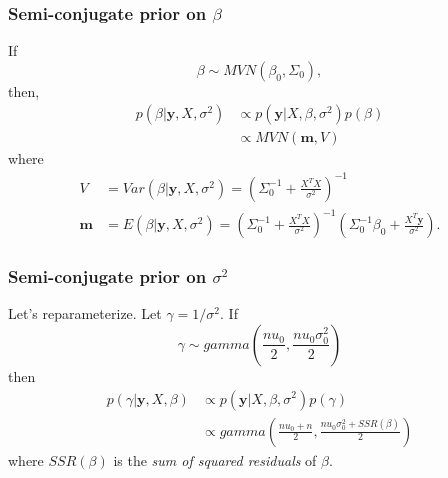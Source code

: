 \documentclass[titlepage, 12pt, leqno]{article}
\begin{document}
\subsubsection{Semi-conjugate prior on $\beta$}
If
\[
\beta \sim MVN(\beta_{0},\Sigma_{0}),
\]
then,
\begin{align*}
    p(\beta|\textbf{y},X,\sigma^{2}) &\propto p(\textbf{y}|X, \beta, \sigma^{2})
    p(\beta)\\
                                     &\propto MVN(\textbf{m},V)
\end{align*}
where
\begin{align*}
    V &= Var(\beta|\textbf{y},X,\sigma^{2}) = \left(\Sigma_{0}^{-1} +
        \frac{X^{T}X}{\sigma^{2}}\right)^{-1}\\
    \textbf{m} &= E(\beta|\textbf{y},X,\sigma^{2}) = \left(\Sigma_{0}^{-1} +
        \frac{X^{T}X}{\sigma^{2}}\right)^{-1}\left(\Sigma_{0}^{-1}\beta_{0}+
        \frac{X^{T}\textbf{y}}{\sigma^{2}}\right).
\end{align*}

\subsubsection{Semi-conjugate prior on $\sigma^{2}$}
Let's reparameterize. Let $\gamma = 1/\sigma^{2}$. If
\[
\gamma \sim gamma\left(\frac{nu_{0}}{2}, \frac{nu_{0}\sigma^{2}_{0}}{2}\right)
\]
then
\begin{align*}
    p(\gamma|\textbf{y}, X, \beta) &\propto p(\textbf{y}|X,\beta,\sigma^{2})
    p(\gamma)\\
                                   &\propto gamma\left(\frac{nu_{0}+n}{2},
                                       \frac{nu_{0}\sigma^{2}_{0} +
                                       SSR(\beta)}{2}\right)
\end{align*}
where $SSR(\beta)$ is the \textit{sum of squared residuals} of $\beta$.
\end{document}
